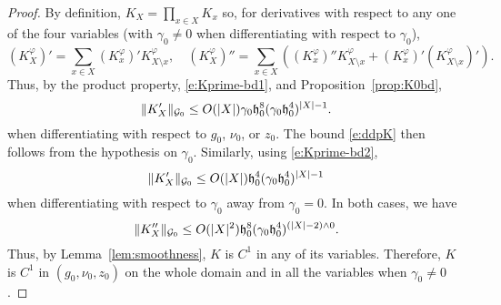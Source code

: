 \begin{proof}
By definition, $K_X = \prod_{x \in X} K_x$ so, for derivatives with respect to any one
of the four variables (with $\gamma_0 \neq 0$ when differentiating with respect to $\gamma_0$),
\begin{equation}
\label{e:KXprime}
(K^\varphi_X)'  = \sum_{x \in X} (K^\varphi_x)' K^\varphi_{X \setminus x}, \quad
(K^\varphi_X)'' = \sum_{x \in X} ((K^\varphi_x)'' K^\varphi_{X \setminus x} + (K^\varphi_x)' (K^\varphi_{X \setminus x})').
\end{equation}
Thus, by the product property, \eqref{e:Kprime-bd1}, and Proposition~\ref{prop:K0bd},
\begin{equation}
\|K'_X\|_{\mathcal{G}_0}
  \le
O(|X|) \gamma_0 \mathfrak{h}_0^8 (\gamma_0 \mathfrak{h}_0^4)^{|X|-1}.
\end{equation}
when differentiating with respect to $g_0$, $\nu_0$, or $z_0$.
The bound \eqref{e:ddpK} then follows from the hypothesis on $\gamma_0$.
Similarly, using \eqref{e:Kprime-bd2},
\begin{equation}
\|K'_X\|_{\mathcal{G}_0}
  \le
O(|X|) \mathfrak{h}_0^4 (\gamma_0 \mathfrak{h}_0^4)^{|X|-1}
\end{equation}
when differentiating with respect to $\gamma_0$ away from $\gamma_0 = 0$.
In both cases, we have
\begin{equation}
\|K''_X\|_{\mathcal{G}_0}
  \le
O(|X|^2) \mathfrak{h}_0^8 (\gamma_0 \mathfrak{h}_0^4)^{(|X|-2) \wedge 0}.
\end{equation}
Thus, by Lemma~\ref{lem:smoothness}, $K$ is $C^1$ in any of its variables.
Therefore, $K$ is $C^1$ in $(g_0, \nu_0, z_0)$ on the whole domain and in all the variables when $\gamma_0 \ne 0$.


\end{proof}
